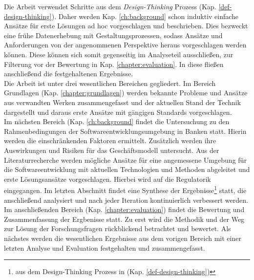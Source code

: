 Die Arbeit verwendet Schritte aus dem \emph{Design-Thinking} Prozess (Kap. \ref{def-design-thinking}). Daher werden Kap. \ref{ch:background} schon induktiv einfache Ansätze für erste Lösungen ad hoc vorgeschlagen und beschrieben. Dies bezweckt eine frühe Datenerhebung mit Gestaltungsprozessen, sodass Ansätze und Anforderungen von der angenommenen Perspektive heraus vorgeschlagen werden können. Diese können sich somit gegenseitig im Analyseteil ausschließen, zur Filterung vor der Bewertung in Kap. \ref{chapter:evaluation}. In diese fließen anschließend die festgehaltenen Ergebnisse.
\bigskip
\\
Die Arbeit ist unter drei wesentlichen Bereichen gegliedert. 
Im Bereich Grundlagen (Kap. \ref{chapter:grundlagen}) werden bekannte Probleme und Ansätze aus verwandten Werken zusammengefasst und der aktuellen Stand der Technik dargestellt und daraus erste Ansätze mit gängigen Standards vorgeschlagen. 
\medskip
\\
Im nächsten Bereich (Kap. \ref{ch:background} findet die Untersuchung zu den Rahmenbedingungen der Softwareentwicklungsumgebung in Banken statt. Hierin werden die einschränkenden Faktoren ermittelt. Zusätzlich werden ihre Auswirkungen und Risiken für das Geschäftsmodell untersucht. Aus der Literaturrecherche werden mögliche Ansätze für eine angemessene Umgebung für die Softwareentwicklung mit aktuellen Technologien und Methoden abgeleitet und erste Lösungsansätze vorgeschlagen. Hierbei wird auf die Regulatorik eingegangen. Im letzten Abschnitt findet eine Synthese der Ergebnisse\footnote{aus dem Design-Thinking Prozess in (Kap. \ref{def-design-thinking})} statt, die anschließend analysiert und nach jeder Iteration kontinuierlich verbessert werden.
\medskip
\\
Im anschließenden Bereich (Kap. \ref{chapter:evaluation}) findet die Bewertung und Zusammenfassung der Ergbenisse statt. Zu erst wird die Methodik und der Weg zur Lösung der Forschungsfragen rückblickend betrachtet und bewertet. Als nächstes werden die wesentlichen Ergebnisse aus dem vorigen Bereich mit einer letzten Analyse und Evaluation festgehalten und zusammengefasst.
